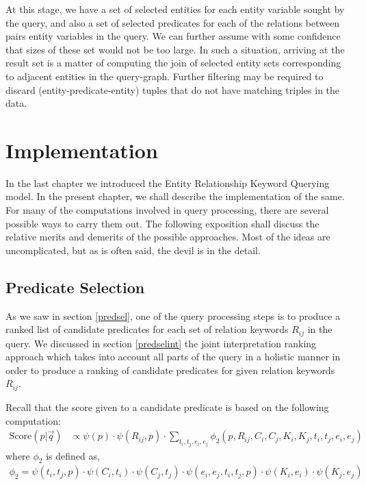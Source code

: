 \documentclass[a4paper, twoside, 12pt]{report}
\begin{document}
At this stage, we have a set of selected entities for each entity variable sought by the query, and also a set of selected predicates for each of the relations between pairs entity variables in the query. We can further assume with some confidence that sizes of these set would not be too large. In such a situation, arriving at the result set is a matter of computing the join of selected entity sets corresponding  to adjacent entities in the query-graph. Further filtering may be required to discard (entity-predicate-entity) tuples that do not have matching triples in the data.




\chapter{Implementation}

In the last chapter we introduced the Entity Relationship Keyword Querying model. In the present chapter, we shall describe the implementation of the same. For many of the computations involved in query processing, there are several possible ways to carry them out. The following exposition shall discuss the relative merits and demerits of the possible approaches. Most of the ideas are uncomplicated, but as is often said, the devil is in the detail.

\section{Predicate Selection}
As we saw in section \ref{predsel}, one of the query processing steps is to produce a ranked list of candidate predicates for each set of relation keywords $R_{ij}$ in the query. We discussed in section \ref{predselint} the joint interpretation ranking approach which takes into account all parts of the query in a holistic manner in order to produce a ranking of candidate predicates for given relation keywords $R_{ij}$.

Recall that the score given to a candidate predicate is based on the following computation:
\begin{align}
\text{Score}(p|\vec{q})& \propto \psi(p) \cdot \psi(R_{ij},p) \cdot \sum_{t_i,t_j,e_i,e_j} \phi_2(p, R_{ij}, C_i, C_j, K_i, K_j, t_i, t_j, e_i, e_j) \label{eq:predsel1}
\end{align}
where $\phi_2$ is defined as,
\begin{align}
\phi_2 =  \psi(t_i,t_j,p) \cdot \psi(C_i,t_i) \cdot \psi(C_j,t_j) \cdot \psi(e_i,e_j,t_i,t_j,p) \cdot \psi(K_i,e_i) \cdot \psi(K_j,e_j) \label{eq:phi2}
\end{align}
\end{document}
